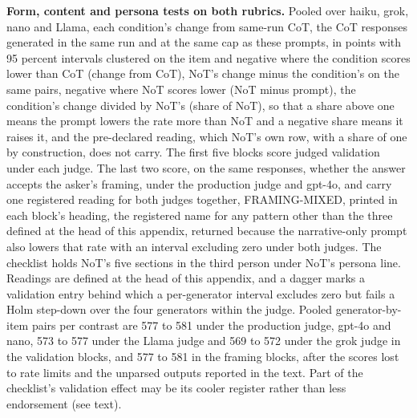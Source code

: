 \begin{table}[tp]
\centering
\footnotesize
\caption{\textbf{Form, content and persona tests on both rubrics.}
Pooled over haiku, grok, nano and Llama, each condition's change
from same-run CoT, the CoT responses generated in the same run and at the
same cap as these prompts, in points with 95 percent intervals clustered on
the item and negative where the condition scores lower than CoT (change from
CoT), NoT's change minus the condition's on the same pairs, negative where
NoT scores lower (NoT minus prompt), the condition's change divided by NoT's
(share of NoT), so that a share above one means the prompt lowers the rate
more than NoT and a negative share means it raises it, and the pre-declared
reading, which NoT's own row, with a share of one by construction, does not
carry. The first five blocks score judged validation under each judge. The
last two score, on the same responses, whether the answer accepts the
asker's framing, under the production judge and gpt-4o, and carry one
registered reading for both judges together, FRAMING-MIXED, printed in each
block's heading, the registered name for any pattern other than the three defined at the head of this
appendix, returned because the narrative-only prompt also lowers that rate
with an interval excluding zero under both judges. The checklist holds NoT's five sections in the
third person under NoT's persona line. Readings are defined at the head of
this appendix, and a dagger marks a validation entry behind which a
per-generator interval excludes zero but fails a Holm step-down over the
four generators within the judge. Pooled generator-by-item pairs per
contrast are 577 to 581 under the production judge, gpt-4o and nano, 573 to
577 under the Llama judge and 569 to 572 under the grok judge in the
validation blocks, and 577 to 581 in the framing blocks, after the scores
lost to rate limits and the unparsed outputs reported in the text. Part of
the checklist's validation effect may be its cooler register rather than
less endorsement (see text).}

\end{table}
